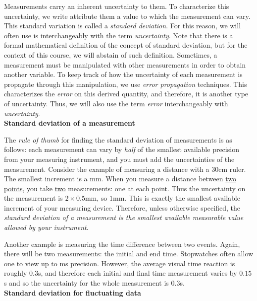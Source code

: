 \documentclass[12pt]{report}
\begin{document}
Measurements carry an inherent uncertainty to them.
To characterize this uncertainty, we write attribute them a value to which the measurement can vary. This standard variation is called a \textit{standard deviation}. For this reason, we will often use is interchangeably with the term \textit{uncertainty}. 
Note that there is a formal mathematical definition of the concept of standard deviation, but for the context of this course, we will abstain of such definition.
Sometimes, a measurement must be manipulated with other measurements in order to obtain another variable. To keep track of how the uncertainty of each measurement is propagate through this manipulation, we use \textit{error propagation} techniques. This characterizes the \textit{error} on this derived quantity, and therefore, it is another type of uncertainty.
Thus, we will also use the term \textit{error} interchangeably with \textit{uncertainty}.\\

\noindent \large \textbf{Standard deviation of a measurement} \normalsize

The \textit{rule of thumb} for finding the standard deviation of measurements is as follows: each measurement can vary by \textit{half} of the smallest available precision from your measuring instrument, and you must add the uncertainties of the measurement. Consider the example of measuring a distance with a 30cm ruler. The smallest increment is a mm. When you measure a distance between \underline{two points}, you take \underline{two} measurements: one at each point. Thus the uncertainty on the measurement is $2 \times 0.5$mm, so $1$mm. This is exactly the smallest available increment of your measuring device. Therefore, unless otherwise specified, the \textit{standard deviation of a measurement is the smallest available measurable value allowed by your instrument}. 

Another example is measuring the time difference between two events. Again, there will be two measurements: the initial and end time. Stopwatches often allow one to view up to ms precision. However, the average visual time reaction is roughly $0.3$s, and therefore each initial and final time measurement varies by $0.15$s and so the uncertainty for the whole measurement is $0.3$s. \\

\noindent \large \textbf{Standard deviation for fluctuating data} \normalsize
\end{document}
